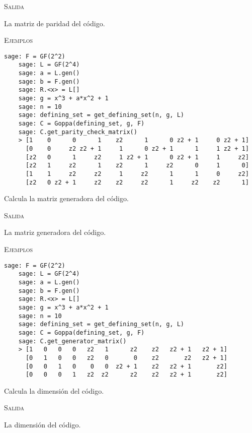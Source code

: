 \begin{description}[leftmargin=1em, font=\normalfont\ttfamily, style=nextline]
\begin{description}[font=\ttfamily, style=nextline]
  \textsc{Salida}
  \begin{description}[font=\normalfont\ttfamily]
    \item[] La matriz de paridad del código.
  \end{description}

  \textsc{Ejemplos}
  \begin{lstlisting}[gobble=4]
    sage: F = GF(2^2)
    sage: L = GF(2^4)
    sage: a = L.gen()
    sage: b = F.gen()
    sage: R.<x> = L[]
    sage: g = x^3 + a*x^2 + 1
    sage: n = 10
    sage: defining_set = get_defining_set(n, g, L)
    sage: C = Goppa(defining_set, g, F)
    sage: C.get_parity_check_matrix()
    > [1    0      0      1    z2      1      0 z2 + 1     0 z2 + 1]
      [0    0     z2 z2 + 1     1      0 z2 + 1      1     1 z2 + 1]
      [z2   0      1     z2     1 z2 + 1      0 z2 + 1     1     z2]
      [z2   1     z2      1    z2      1     z2      0     1      0]
      [1    1     z2     z2     1     z2      1      1     0     z2]
      [z2   0 z2 + 1     z2    z2     z2      1     z2    z2      1]
  \end{lstlisting}

  \item[get\_generator\_matrix(self)] Calcula la matriz generadora del código.
  
  \textsc{Salida}
  \begin{description}[font=\normalfont\ttfamily]
    \item[] La matriz generadora del código.
  \end{description}

  \textsc{Ejemplos}
  \begin{lstlisting}[gobble=4]
    sage: F = GF(2^2)
    sage: L = GF(2^4)
    sage: a = L.gen()
    sage: b = F.gen()
    sage: R.<x> = L[]
    sage: g = x^3 + a*x^2 + 1
    sage: n = 10
    sage: defining_set = get_defining_set(n, g, L)
    sage: C = Goppa(defining_set, g, F)
    sage: C.get_generator_matrix()
    > [1   0   0   0   z2   1      z2    z2   z2 + 1   z2 + 1]
      [0   1   0   0   z2   0       0    z2       z2   z2 + 1]
      [0   0   1   0    0   0  z2 + 1    z2   z2 + 1       z2]
      [0   0   0   1   z2  z2      z2    z2   z2 + 1       z2]
  \end{lstlisting}

  \item[get\_dimension(self)] Calcula la dimensión del código.
  
  \textsc{Salida}
  \begin{description}[font=\normalfont\ttfamily]
    \item[] La dimensión del código.
  \end{description}


\end{description}
\end{description}
